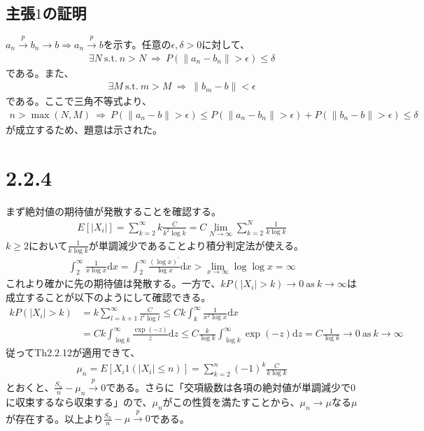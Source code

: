 \documentclass{article}
\begin{document}
\subsection{主張$1$の証明}
$a_n \xrightarrow{p} b_n \to b \Rightarrow a_n \xrightarrow{p} b$を示す。任意の$\epsilon, \delta > 0$に対して、
\begin{align*}
	\exists N\ \text{s.t.}\ n > N\ \Rightarrow\ P(\| a_n -b_n \| > \epsilon) \leq \delta
\end{align*}
である。また、
\begin{align*}
	\exists M\ \text{s.t.}\ m > M\ \Rightarrow\ \|b_m-b\| < \epsilon
\end{align*}
である。ここで三角不等式より、
\begin{align*}
	n > \max(N,M)\ \Rightarrow\ P\left( \| a_n - b \| > \epsilon \right) \leq P\left( \| a_n - b_n \| > \epsilon \right) + P\left( \| b_n - b \| > \epsilon \right) \leq \delta
\end{align*}
が成立するため、題意は示された。

\section{2.2.4}
まず絶対値の期待値が発散することを確認する。
\begin{align*}
	E\left[ |X_i| \right] = \sum_{k = 2}^{\infty} k \frac{C}{k^2 \log k} = C \lim_{N \to \infty} \sum_{k = 2}^{N} \frac{1}{k \log k}
\end{align*}
$k \geq 2$において$\frac{1}{k \log k}$が単調減少であることより積分判定法が使える。
\begin{align*}
	\int_2^{\infty} \frac{1}{x\log x} \mathrm{d}x = \int_2^{\infty} \frac{\left( \log x \right)^{\prime}}{\log x} \mathrm{d}x > \lim_{x\to \infty} \log \log x = \infty
\end{align*}
これより確かに先の期待値は発散する。一方で、$k P\left( |X_i| > k \right) \to 0\ \text{as}\ k \to \infty$は成立することが以下のようにして確認できる。
\begin{align*}
	k P\left( |X_i| > k \right) &= k \sum_{l = k+1}^{\infty} \frac{C}{l^2 \log l} \leq Ck \int_k^{\infty} \frac{1}{x^2 \log x} \mathrm{d}x\\
	&= Ck \int_{\log k}^{\infty} \frac{\exp(-z)}{z} \mathrm{d}z \leq C \frac{k}{\log k} \int_{\log k}^{\infty} \exp(-z) \mathrm{d}z = C \frac{1}{\log k} \to 0\ \text{as}\ k \to \infty
\end{align*}
従ってTh2.2.12が適用できて、
\begin{align*}
	\mu_n = E\left[ X_i 1\left( |X_i| \leq n \right) \right] = \sum_{k = 2}^{n} (-1)^k \frac{C}{k \log k}
\end{align*}
とおくと、$\frac{S_n}{n} - \mu_n \xrightarrow{p} 0$である。さらに「交項級数は各項の絶対値が単調減少で$0$に収束するなら収束する」ので、$\mu_n$がこの性質を満たすことから、$\mu_n \to \mu$なる$\mu$が存在する。以上より$\frac{S_n}{n} - \mu \xrightarrow{p} 0$である。
\end{document}
